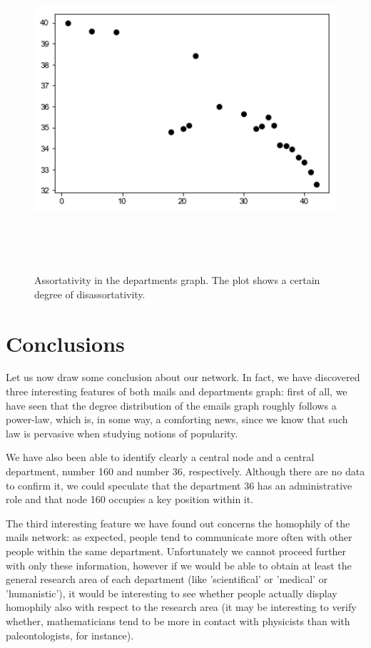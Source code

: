\documentclass{report}
\theoremstyle{definition}
\theoremstyle{remark}
\begin{document}
 \begin{figure} [H]
 	\centering
 	\centerline{\includegraphics[width = 13cm, height = 12cm, keepaspectratio]{assortativity_dep.png}}
 	\label{Ass_dep}
 	\caption{Assortativity in the departments graph. The plot shows a certain degree of disassortativity.}
 \end{figure}
 \section*{Conclusions}

Let us now draw some conclusion about our network. In fact, we have discovered three interesting features of both mails and departments graph: first of all, we have seen that the degree distribution of the emails graph roughly follows a power-law, which is, in some way, a comforting news, since we know that such law is pervasive when studying notions of popularity.

We have also been able to identify clearly a central node and a central department, number 160 and number 36, respectively. Although there are no data to confirm it, we could speculate that the department 36 has an administrative role and that node 160 occupies a key position within it.

The third interesting feature we have found out concerns the homophily of the mails network: as expected, people tend to communicate more often with other people within the same department. Unfortunately we cannot proceed further with only these information, however if we would be able to obtain at least the general research area of each department (like 'scientifical' or 'medical' or 'humanistic'), it would be interesting to see whether people actually display homophily also with respect to the research area (it may be interesting to verify whether, mathematicians tend to be more in contact with physicists than with paleontologists, for instance).
\end{document}
